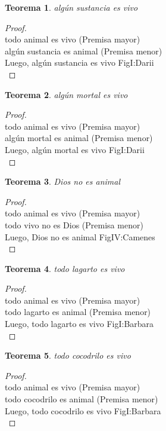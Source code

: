 ﻿\documentclass[12pt]{book}
\newtheorem{theorem}{Teorema}[chapter]
\newtheorem{proof}{Demostración}
\begin{document}
\begin{theorem}
algún sustancia es vivo
\label{th: 49}
\end{theorem}\begin{proof}\\todo animal es vivo	 (Premisa mayor) \\algún sustancia es animal	 (Premisa menor) \\Luego, algún sustancia es vivo	FigI:Darii \\ \end{proof}
\begin{theorem}
algún mortal es vivo
\label{th: 50}
\end{theorem}\begin{proof}\\todo animal es vivo	 (Premisa mayor) \\algún mortal es animal	 (Premisa menor) \\Luego, algún mortal es vivo	FigI:Darii \\ \end{proof}
\begin{theorem}
Dios no es animal
\label{th: 51}
\end{theorem}\begin{proof}\\todo animal es vivo	 (Premisa mayor) \\todo vivo no es Dios	 (Premisa menor) \\Luego, Dios no es animal	FigIV:Camenes \\ \end{proof}
\begin{theorem}
todo lagarto es vivo
\label{th: 52}
\end{theorem}\begin{proof}\\todo animal es vivo	 (Premisa mayor) \\todo lagarto es animal	 (Premisa menor) \\Luego, todo lagarto es vivo	FigI:Barbara \\ \end{proof}
\begin{theorem}
todo cocodrilo es vivo
\label{th: 53}
\end{theorem}\begin{proof}\\todo animal es vivo	 (Premisa mayor) \\todo cocodrilo es animal	 (Premisa menor) \\Luego, todo cocodrilo es vivo	FigI:Barbara \\ \end{proof}
\end{document}

